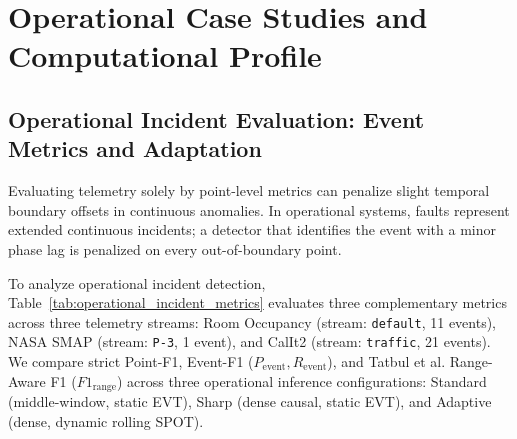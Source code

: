 \section{Operational Case Studies and Computational Profile}
\label{sup:operational}

\subsection{Operational Incident Evaluation: Event Metrics and Adaptation}
\label{subsec:incident_metrics}

Evaluating telemetry solely by point-level metrics can penalize slight temporal boundary offsets in continuous anomalies. In operational systems, faults represent extended continuous incidents; a detector that identifies the event with a minor phase lag is penalized on every out-of-boundary point.

To analyze operational incident detection, Table~\ref{tab:operational_incident_metrics} evaluates three complementary metrics across three telemetry streams: Room Occupancy (stream: \texttt{default}, 11 events), NASA SMAP (stream: \texttt{P-3}, 1 event), and CalIt2 (stream: \texttt{traffic}, 21 events). We compare strict Point-F1, Event-F1 ($P_{\text{event}}, R_{\text{event}}$), and Tatbul et al. Range-Aware F1 ($F1_{\text{range}}$) across three operational inference configurations: Standard (middle-window, static EVT), Sharp (dense causal, static EVT), and Adaptive (dense, dynamic rolling SPOT).

